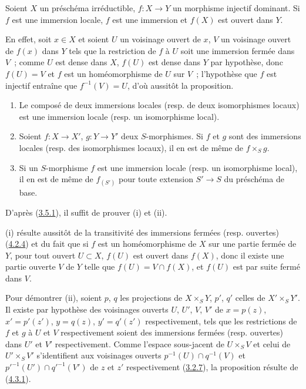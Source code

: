 \begin{proposition}[4.5.4]
\label{I.4.5.4-fr}
Soient $X$ un préschéma irréductible, $f:X\to Y$ un morphisme injectif
dominant. Si $f$ est une immersion locale, $f$ est une immersion et $f(X)$
est ouvert dans $Y$.
\end{proposition}

En effet, soit $x\in X$ et soient $U$ un voisinage ouvert de $x$, $V$ un
voisinage ouvert de $f(x)$ dans $Y$ tels que la restriction de $f$ à $U$
soit une immersion fermée dans $V$~; comme $U$ est dense dans $X$, $f(U)$
est dense dans $Y$ par hypothèse, donc $f(U)=V$ et $f$ est un homéomorphisme
de $U$ sur $V$~; l'hypothèse que $f$ est injectif entraîne que
$f^{-1}(V)=U$, d'où aussitôt la proposition.

\begin{proposition}[4.5.5]
\label{I.4.5.5-fr}
\begin{enumerate}
  \item[\rm(i)] Le composé de deux immersions locales (\textup{resp.} de deux
    isomorphismes locaux) est une immersion locale (\textup{resp.} un isomorphisme
    local).
  \item[\rm(ii)] Soient $f:X\to X'$, $g:Y\to Y'$ deux $S$-morphismes. Si
    $f$ et $g$ sont des immersions locales (\textup{resp.} des isomorphismes locaux),
    il en est de même de $f\times_S g$.
  \item[\rm(iii)] Si un $S$-morphisme $f$ est une immersion locale (\textup{resp.} un
    isomorphisme local), il en est de même de $f_{(S')}$ pour toute extension
    $S'\to S$ du préschéma de base.
\end{enumerate}
\end{proposition}

D'après (\hyperref[I.3.5.1-fr]{3.5.1}), il suffit de prouver (i) et (ii).

(i) résulte aussitôt de la transitivité des immersions fermées (resp.
ouvertes) (\hyperref[I.4.2.4-fr]{4.2.4}) et du fait que si $f$ est un
homéomorphisme de $X$ sur une partie fermée de $Y$, pour tout ouvert
$U\subset X$, $f(U)$ est ouvert dans $f(X)$, donc il existe une partie
ouverte $V$ de $Y$ telle que $f(U)=V\cap f(X)$, et $f(U)$ est par suite fermé
dans $V$.

Pour démontrer (ii), soient $p$, $q$ les projections de $X\times_S Y$, $p'$,
$q'$ celles de $X'\times_S Y'$. Il existe par hypothèse des voisinages
ouverts $U$, $U'$, $V$, $V'$ de $x=p(z)$, $x'=p'(z')$, $y=q(z)$,
$y'=q'(z')$ respectivement, tels que les restrictions de $f$ et $g$ à $U$
et $V$ respectivement soient des immersions fermées (resp. ouvertes) dans
$U'$ et $V'$ respectivement. Comme l'espace sous-jacent de $U\times_S V$ et
celui de $U'\times_S V'$ s'identifient aux voisinages ouverts
$p^{-1}(U)\cap q^{-1}(V)$ et ${p'}^{-1}(U')\cap{q'}^{-1}(V')$ de $z$ et
$z'$ respectivement (\hyperref[I.3.2.7-fr]{3.2.7}), la proposition résulte
de (\hyperref[I.4.3.1-fr]{4.3.1}).
